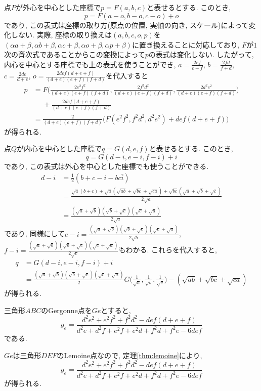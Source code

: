 \begin{prf*}
点$P$が外心を中心とした座標で$p=F(a,b,c)$と表せるとする.
このとき,
\[p=F(a-o,b-o,c-o)+o\]
であり, この表式は座標の取り方(原点の位置, 実軸の向き, スケール)によって変化しない.
実際, 座標の取り換えは$(a,b,c,o,p)$を$(\alpha a+\beta,\alpha b+\beta,\alpha c+\beta,\alpha o+\beta,\alpha p+\beta)$に置き換えることに対応しており, $F$が$1$次の斉次式であることからこの変換によって$p$の表式は変化しない.
したがって, 内心を中心とする座標でも上の表式を使うことができ, $a=\frac{2ef}{e+f}$, $b=\frac{2fd}{f+d}$, $c=\frac{2de}{d+e}$, $o=\frac{2def(d+e+f)}{(d+e)(e+f)(f+d)}$を代入すると
\begin{align*}
p
&=F\biggl(\frac{2e^2f^2}{(d+e)(e+f)(f+d)},\frac{2f^2d^2}{(d+e)(e+f)(f+d)},\frac{2d^2e^2}{(d+e)(e+f)(f+d)}\biggr)\\
&\phantom{{}={}}+\frac{2def(d+e+f)}{(d+e)(e+f)(f+d)}\\
&=\frac{2}{(d+e)(e+f)(f+d)}\bigl(F(e^2f^2,f^2d^2,d^2e^2)+def(d+e+f)\bigr)
\end{align*}
が得られる.

点$Q$が内心を中心とした座標で$q=G(d,e,f)$と表せるとする.
このとき,
\[q=G(d-i,e-i,f-i)+i\]
であり, この表式は外心を中心とした座標でも使うことができる.
\begin{align*}
d-i
&=\frac 12(b+c-i-bc\bar{i})\\
&=\frac{\sqrt{a}(b+c)+\sqrt{a}(\sqrt{ab}+\sqrt{bc}+\sqrt{ca})+\sqrt{bc}(\sqrt{a}+\sqrt{b}+\sqrt{c})}{2\sqrt{a}}\\
&=\frac{(\sqrt{a}+\sqrt{b})(\sqrt{b}+\sqrt{c})(\sqrt{c}+\sqrt{a})}{2\sqrt{a}}
\end{align*}
であり, 同様にして$e-i=\frac{(\sqrt{a}+\sqrt{b})(\sqrt{b}+\sqrt{c})(\sqrt{c}+\sqrt{a})}{2\sqrt{b}}$, $f-i=\frac{(\sqrt{a}+\sqrt{b})(\sqrt{b}+\sqrt{c})(\sqrt{c}+\sqrt{a})}{2\sqrt{c}}$もわかる.
これらを代入すると,
\begin{align*}
q
&=G(d-i,e-i,f-i)+i\\
&=\frac{(\sqrt{a}+\sqrt{b})(\sqrt{b}+\sqrt{c})(\sqrt{c}+\sqrt{a})}{2}G\biggl(\frac{1}{\sqrt{a}},\frac{1}{\sqrt{b}},\frac{1}{\sqrt{c}}\biggr)-(\sqrt{ab}+\sqrt{bc}+\sqrt{ca})
\end{align*}
が得られる.
\end{prf*}
%
\begin{bthm}
三角形$ABC$のGergonne点を$Ge$とすると,
\[g_e=\frac{d^2e^2+e^2f^2+f^2d^2-def(d+e+f)}{d^2e+d^2f+e^2f+e^2d+f^2d+f^2e-6def}\]
である.
\end{bthm}
\begin{prf*}
$Ge$は三角形$DEF$のLemoine点なので, 定理\ref{thm:lemoine}により,
\[g_e=\frac{d^2e^2+e^2f^2+f^2d^2-def(d+e+f)}{d^2e+d^2f+e^2f+e^2d+f^2d+f^2e-6def}\]
が得られる.
\end{prf*}
